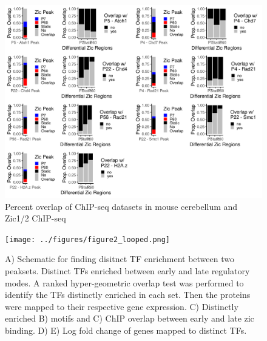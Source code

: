 \documentclass[fleqn,10pt,twocolumn]{wlscirep}
\begin{document}
\begin{figure}[ht]
\centering
\includegraphics[width=.95\textwidth]{../figures/supp_figure_chip_overlap.png }
\caption{Percent overlap of ChIP-seq datasets in mouse cerebellum and Zic1/2 ChIP-seq}
\label{fig:chip_overlap}
\end{figure}

\begin{figure}[!ht]
\centering
\texttt{[image: ../figures/figure2\_looped.png]}
\caption{A) Schematic for finding disitnct TF enrichment between two peaksets. Distinct TFs enriched between early and late regulatory modes. A ranked hyper-geometric overlap test was performed to identify the TFs distinctly enriched in each set. Then the proteins were mapped to their respective gene expression. C) Distinctly enriched B) motifs and C) ChIP overlap between early and late zic binding. D) E) Log fold change of genes mapped to distinct TFs.  }
\label{fig:DistinctTFs_looped}
\end{figure}
\end{document}
